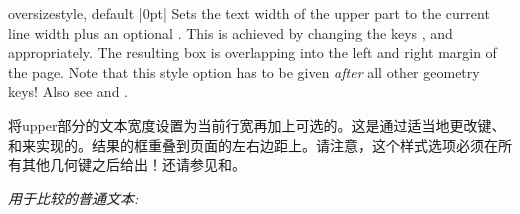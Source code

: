 \begin{docTcbKey}{oversize}{}{style, default |0pt|}
Sets the text width of the upper part to the current line width plus an
optional .
This is achieved by changing the keys 
, and
 appropriately.
The resulting box is overlapping into the left and right margin of
the page.
Note that this style option has to be given \emph{after} all other
geometry keys!
Also see  and .

将upper部分的文本宽度设置为当前行宽再加上可选的。这是通过适当地更改键、和来实现的。结果的框重叠到页面的左右边距上。请注意，这个样式选项必须在所有其他几何键之后给出！还请参见和。

\begin{dispListing}

\textit{用于比较的普通文本:}\\
\lipsum[2]

\begin{tcolorbox}[oversize,title=Oversized box]
\lipsum[2]
\end{tcolorbox}

\begin{tcolorbox}[title=Normal box]
\lipsum[2]
\end{tcolorbox}
\end{dispListing}
\end{docTcbKey}

{\tcbusetemp}

  